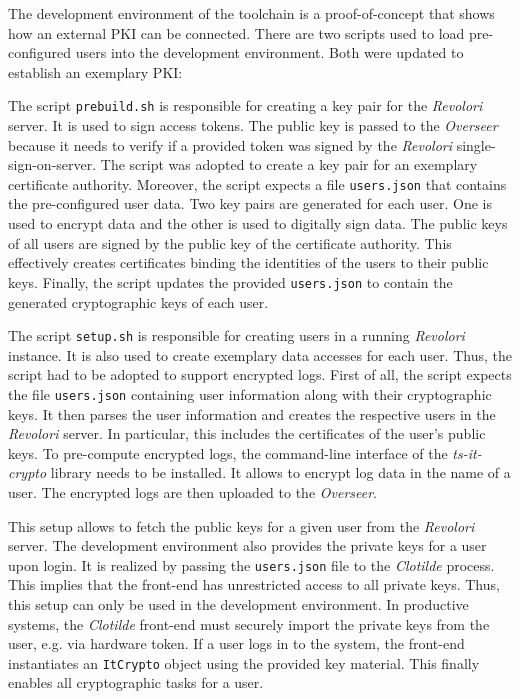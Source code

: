 \documentclass[../main.tex]{subfiles}
\begin{document}
The development environment of the toolchain is a proof-of-concept that shows how an external PKI can be connected.
There are two scripts used to load pre-configured users into the development environment.
Both were updated to establish an exemplary PKI:

The script \verb|prebuild.sh| is responsible for creating a key pair for the \emph{Revolori} server.
It is used to sign access tokens.
The public key is passed to the \emph{Overseer} because it needs to verify if a provided token was signed by the \emph{Revolori} single-sign-on-server.
The script was adopted to create a key pair for an exemplary certificate authority.
Moreover, the script expects a file \verb|users.json| that contains the pre-configured user data.
Two key pairs are generated for each user.
One is used to encrypt data and the other is used to digitally sign data.
The public keys of all users are signed by the public key of the certificate authority.
This effectively creates certificates binding the identities of the users to their public keys.
Finally, the script updates the provided \verb|users.json| to contain the generated cryptographic keys of each user.

The script \verb|setup.sh| is responsible for creating users in a running \emph{Revolori} instance.
It is also used to create exemplary data accesses for each user.
Thus, the script had to be adopted to support encrypted logs.
First of all, the script expects the file \verb|users.json| containing user information along with their cryptographic keys.
It then parses the user information and creates the respective users in the \emph{Revolori} server.
In particular, this includes the certificates of the user's public keys.
To pre-compute encrypted logs, the command-line interface of the \emph{ts-it-crypto} library needs to be installed.
It allows to encrypt log data in the name of a user.
The encrypted logs are then uploaded to the \emph{Overseer}.

This setup allows to fetch the public keys for a given user from the \emph{Revolori} server.
The development environment also provides the private keys for a user upon login.
It is realized by passing the \verb|users.json| file to the \emph{Clotilde} process.
This implies that the front-end has unrestricted access to all private keys.
Thus, this setup can only be used in the development environment.
In productive systems, the \emph{Clotilde} front-end must securely import the private keys from the user, e.g. via hardware token.
If a user logs in to the system, the front-end instantiates an \verb|ItCrypto| object using the provided key material.
This finally enables all cryptographic tasks for a user.
\end{document}
